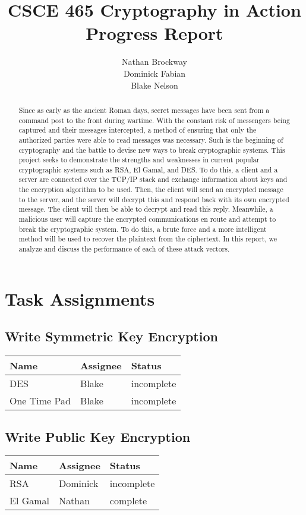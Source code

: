 \documentclass{report}
\title{CSCE 465 Cryptography in Action Progress Report}
\author{Nathan Brockway\\Dominick Fabian\\Blake Nelson}
\begin{document}
\maketitle

\begin{abstract}
    Since as early as the ancient Roman days, secret messages have been sent from a command post to the front during wartime. With the constant risk of messengers being captured and their messages intercepted, a method of ensuring that only the authorized parties were able to read messages was necessary. Such is the beginning of cryptography and the battle to devise new ways to break cryptographic systems. This project seeks to demonstrate the strengths and weaknesses in current popular cryptographic systems such as RSA, El Gamal, and DES. To do this, a client and a server are connected over the TCP/IP stack and exchange information about keys and the encryption algorithm to be used. Then, the client will send an encrypted message to the server, and the server will decrypt this and respond back with its own encrypted message. The client will then be able to decrypt and read this reply. Meanwhile, a malicious user will capture the encrypted communications en route and attempt to break the cryptographic system. To do this, a brute force and a more intelligent method will be used to recover the plaintext from the ciphertext. In this report, we analyze and discuss the performance of each of these attack vectors.
\end{abstract}

\section{Task Assignments}
\subsection{Write Symmetric Key Encryption}
\begin{tabular}{l|l|l}
    Name & Assignee & Status \\ \hline
    DES & Blake & incomplete \\
    One Time Pad & Blake & incomplete	 
\end{tabular}

\subsection{Write Public Key Encryption}
\begin{tabular}{l|l|l}
    Name & Assignee & Status \\ \hline
    RSA & Dominick & incomplete \\
    El Gamal & Nathan & complete
\end{tabular}
\end{document}
